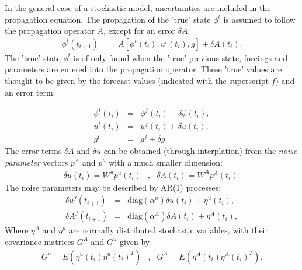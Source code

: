 \documentclass[a4paper,12pt]{article}
\begin{document}
In the general case of a stochastic model, uncertainties are included
in the propagation equation. The propagation of the 'true' state $\phi^t$ 
is assumed to follow the propagation operator $A$, except for an error 
$\delta A$:
\begin{eqnarray}
\phi^t \left(t_{i+1} \right) &=& A \left[ \phi^t \left( t_i \right),
                                 u^t \left(t_i \right), 
                                 g \right] + \delta A \left( t_i \right).
\end{eqnarray}
The 'true' state $\phi^t$ is of only found when the 'true' previous state, 
forcings and parameters are entered into the propagation operator. These
'true' values are thought to be given by the forecast values (indicated 
with the superscript $f$) and an error term:

\begin{eqnarray}
\phi^t(t_i) &=& \phi^f \left(t_i \right) +
                                 \delta \phi\left(t_i\right),
\nonumber \\
u^t\left(t_i\right) &=& u^f\left(t_i\right) +
                        \delta u \left(t_i\right),
\nonumber \\
g^t &=& g^f+ \delta g
\label{Eq: error terms in phi, u, g}
\end{eqnarray}
The error terms $\delta A$ and $\delta u$ can be
obtained (through interplation) from the {\em noise parameter} vectors 
$p^A$ and $p^u$ with a much smaller dimension:
\begin{eqnarray}
 \delta u(t_i) = W^u p^u(t_i) &,&
 \delta A(t_i) = W^A p^A(t_i).
\end{eqnarray}
The noise parameters may be described by AR(1) processes:
\begin{eqnarray}
   \delta u^f(t_{i+1}) &=& \mbox{diag}(\alpha^u) \delta u(t_i) +
\eta^u(t_i),
\nonumber \\
   \delta A^f(t_{i+1}) &=& \mbox{diag}(\alpha^A) \delta A(t_i) + 
\eta^A(t_i),
\label{eq: AR 1}
\end{eqnarray}
Where $\eta^A$ and $\eta^u$ are normally distributed stochastic variables, 
with their covariance matrices $G^A$ and $G^u$ given by 
\begin{eqnarray}
G^u = E(\eta^u(t_i) \eta^u(t_i)^T) &,& 
G^A = E(\eta^A(t_i) \eta^A(t_i)^T).
\end{eqnarray}
\end{document}
